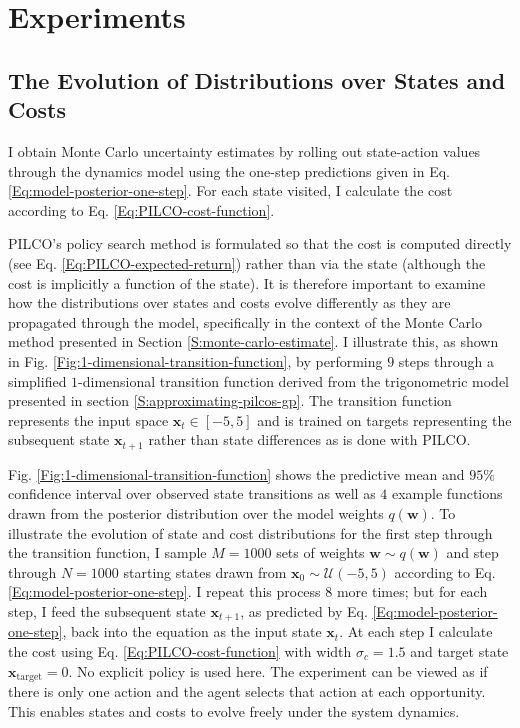 \section{Experiments}
\label{S:results}
\subsection{The Evolution of Distributions over States and Costs}
I obtain Monte Carlo uncertainty estimates by rolling out state-action values through the dynamics model using the one-step predictions given in Eq. \ref{Eq:model-posterior-one-step}. For each state visited, I calculate the cost according to Eq. \ref{Eq:PILCO-cost-function}. 

PILCO's policy search method is formulated so that the cost is computed directly (see Eq. \ref{Eq:PILCO-expected-return}) rather than via the state (although the cost is implicitly a function of the state). It is therefore important to examine how the distributions over states and costs evolve differently as they are propagated through the model, specifically in the context of the Monte Carlo method presented in Section \ref{S:monte-carlo-estimate}. I illustrate this, as shown in Fig. \ref{Fig:1-dimensional-transition-function}, by performing $9$ steps through a simplified $1$-dimensional transition function derived from the trigonometric model presented in section \ref{S:approximating-pilcos-gp}.  The transition function represents the input space $\mathbf{x}_{t}\in [-5, 5]$ and is trained on targets representing the subsequent state $\mathbf{x}_{t+1}$ rather than state differences as is done with PILCO. 

Fig. \ref{Fig:1-dimensional-transition-function} shows the predictive mean and $95\%$ confidence interval over observed state transitions as well as $4$ example functions drawn from the posterior distribution over the model weights $q(\mathbf{w})$. To illustrate the evolution of state and cost distributions for the first step through the transition function, I sample $M=1000$ sets of weights $\mathbf{w} \sim q(\mathbf{w})$ and step through $N=1000$ starting states drawn from $\mathbf{x}_{0} \sim \mathcal{U}(-5,5)$ according to Eq. \ref{Eq:model-posterior-one-step}. I repeat this process $8$ more times; but for each step, I feed the subsequent state $\mathbf{x}_{t+1}$, as predicted by Eq. \ref{Eq:model-posterior-one-step}, back into the equation as the input state $\mathbf{x}_{t}$. At each step I calculate the cost using Eq. \ref{Eq:PILCO-cost-function} with width $\sigma_{c}=1.5$ and target state $\mathbf{x}_{\text{target}}=0$. No explicit policy is used here. The experiment can be viewed as if there is only one action and the agent selects that action at each opportunity. This enables states and costs to evolve freely under the system dynamics.

